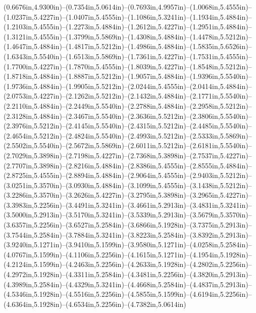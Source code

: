 (0.6676in,4.9300in)--(0.7354in,5.0614in)--(0.7693in,4.9957in)--(1.0068in,5.4555in)--(1.0237in,5.4227in)--(1.0407in,5.4555in)--(1.1086in,5.3241in)--(1.1934in,5.4884in)--(1.2103in,5.4555in)--(1.2273in,5.4884in)--(1.2612in,5.4227in)--(1.2951in,5.4884in)--(1.3121in,5.4555in)--(1.3799in,5.5869in)--(1.4308in,5.4884in)--(1.4478in,5.5212in)--(1.4647in,5.4884in)--(1.4817in,5.5212in)--(1.4986in,5.4884in)--(1.5835in,5.6526in)--(1.6343in,5.5540in)--(1.6513in,5.5869in)--(1.7361in,5.4227in)--(1.7531in,5.4555in)--(1.7700in,5.4227in)--(1.7870in,5.4555in)--(1.8039in,5.4227in)--(1.8548in,5.5212in)--(1.8718in,5.4884in)--(1.8887in,5.5212in)--(1.9057in,5.4884in)--(1.9396in,5.5540in)--(1.9736in,5.4884in)--(1.9905in,5.5212in)--(2.0244in,5.4555in)--(2.0414in,5.4884in)--(2.0753in,5.4227in)--(2.1262in,5.5212in)--(2.1432in,5.4884in)--(2.1771in,5.5540in)--(2.2110in,5.4884in)--(2.2449in,5.5540in)--(2.2788in,5.4884in)--(2.2958in,5.5212in)--(2.3128in,5.4884in)--(2.3467in,5.5540in)--(2.3636in,5.5212in)--(2.3806in,5.5540in)--(2.3976in,5.5212in)--(2.4145in,5.5540in)--(2.4315in,5.5212in)--(2.4485in,5.5540in)--(2.4654in,5.5212in)--(2.4824in,5.5540in)--(2.4993in,5.5212in)--(2.5333in,5.5869in)--(2.5502in,5.5540in)--(2.5672in,5.5869in)--(2.6011in,5.5212in)--(2.6181in,5.5540in)--(2.7029in,5.3898in)--(2.7198in,5.4227in)--(2.7368in,5.3898in)--(2.7537in,5.4227in)--(2.7707in,5.3898in)--(2.8216in,5.4884in)--(2.8386in,5.4555in)--(2.8555in,5.4884in)--(2.8725in,5.4555in)--(2.8894in,5.4884in)--(2.9064in,5.4555in)--(2.9403in,5.5212in)--(3.0251in,5.3570in)--(3.0930in,5.4884in)--(3.1099in,5.4555in)--(3.1438in,5.5212in)--(3.2286in,5.3570in)--(3.2626in,5.4227in)--(3.2795in,5.3898in)--(3.2965in,5.4227in)--(3.3983in,5.2256in)--(3.4491in,5.3241in)--(3.4661in,5.2913in)--(3.4831in,5.3241in)--(3.5000in,5.2913in)--(3.5170in,5.3241in)--(3.5339in,5.2913in)--(3.5679in,5.3570in)--(3.6357in,5.2256in)--(3.6527in,5.2584in)--(3.6866in,5.1928in)--(3.7375in,5.2913in)--(3.7544in,5.2584in)--(3.7884in,5.3241in)--(3.8223in,5.2584in)--(3.8392in,5.2913in)--(3.9240in,5.1271in)--(3.9410in,5.1599in)--(3.9580in,5.1271in)--(4.0258in,5.2584in)--(4.0767in,5.1599in)--(4.1106in,5.2256in)--(4.1615in,5.1271in)--(4.1954in,5.1928in)--(4.2124in,5.1599in)--(4.2463in,5.2256in)--(4.2633in,5.1928in)--(4.2802in,5.2256in)--(4.2972in,5.1928in)--(4.3311in,5.2584in)--(4.3481in,5.2256in)--(4.3820in,5.2913in)--(4.3989in,5.2584in)--(4.4329in,5.3241in)--(4.4668in,5.2584in)--(4.4837in,5.2913in)--(4.5346in,5.1928in)--(4.5516in,5.2256in)--(4.5855in,5.1599in)--(4.6194in,5.2256in)--(4.6364in,5.1928in)--(4.6534in,5.2256in)--(4.7382in,5.0614in)
